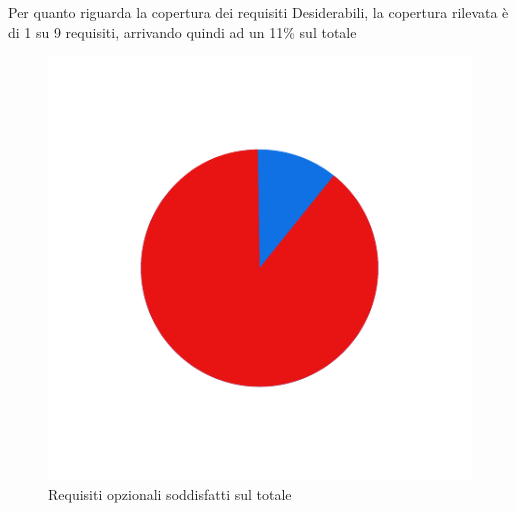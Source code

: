 \newpage

Per quanto riguarda la copertura dei requisiti Desiderabili, la copertura rilevata è di 1 su 9
requisiti, arrivando quindi ad un 11\% sul totale
\begin{figure}[H]
    \centering
    \includegraphics[width=\textwidth]{images/requisiti_op.png}
    \caption{Requisiti opzionali soddisfatti sul totale}
    \label{fig:Requisiti Opzionali}
\end{figure}





